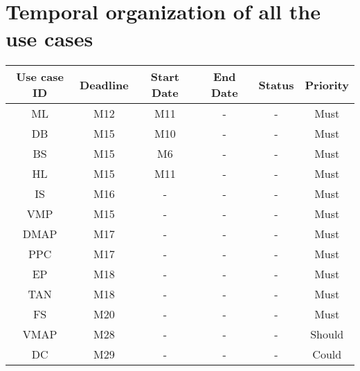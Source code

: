\newpage
\section*{Temporal organization of all the use cases}
\label{sec:allusecases}

\begin{table}[H]
\begin{tabular}{cccccc}
\hline
\textbf{Use case ID} & \textbf{Deadline} & \textbf{Start Date} & \textbf{End Date} & \textbf{Status} & \textbf{Priority}\\
\hline
ML & M12 & M11 &  - & - & Must \\
DB & M15 & M10 & - & - & Must \\
BS & M15 & M6 &  - & - & Must \\
HL & M15 & M11 &  - & - & Must \\
IS & M16 & - &  - & - & Must \\
VMP & M15 & - &  - & - & Must \\
DMAP & M17 & - &  - & - & Must \\
PPC & M17 & - &  - & - & Must \\
EP & M18 & - &  - & - & Must \\
TAN & M18 & - &  - & - & Must \\
FS & M20 & - &  - & - & Must \\
VMAP & M28 & - & - & - & Should \\
DC & M29 & - &  - & - & Could \\
\hline
\end{tabular}
\end{table}